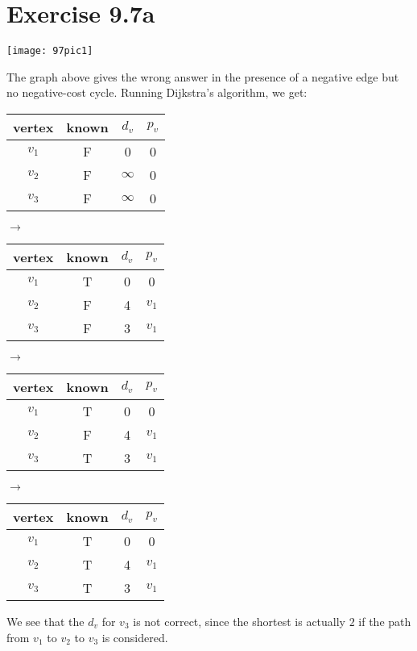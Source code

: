 \documentclass[12pt]{article}
\begin{document}
\section{Exercise 9.7a}
\begin{center}
\texttt{[image: 97pic1]}
\end{center}
The graph above gives the wrong answer in the presence of a negative edge but no negative-cost cycle. Running Dijkstra's algorithm, we get:
\begin{center}
\begin{tabular}{ c c c c } 
vertex & known & $d_v$ & $p_v$ \\
 \hline
$v_1$ & F & 0 & 0 \\
$v_2$ & F & $\infty$ & 0 \\
$v_3$ & F & $\infty$ & 0 \\
\end{tabular}
$\rightarrow$
\begin{tabular}{ c c c c } 
vertex & known & $d_v$ & $p_v$ \\
 \hline
$v_1$ & T & 0 & 0 \\
$v_2$ & F & 4 & $v_1$ \\
$v_3$ & F & 3 & $v_1$ \\
\end{tabular}
$\rightarrow$
\begin{tabular}{ c c c c } 
vertex & known & $d_v$ & $p_v$ \\
 \hline
$v_1$ & T & 0 & 0 \\
$v_2$ & F & 4 & $v_1$ \\
$v_3$ & T & 3 & $v_1$ \\
\end{tabular}
$\rightarrow$
\begin{tabular}{ c c c c } 
vertex & known & $d_v$ & $p_v$ \\
 \hline
$v_1$ & T & 0 & 0 \\
$v_2$ & T & 4 & $v_1$ \\
$v_3$ & T & 3 & $v_1$ \\
\end{tabular}
\end{center}

We see that the $d_v$ for $v_3$ is not correct, since the shortest is actually $2$ if the path from $v_1$ to $v_2$ to $v_3$ is considered.
\end{document}
